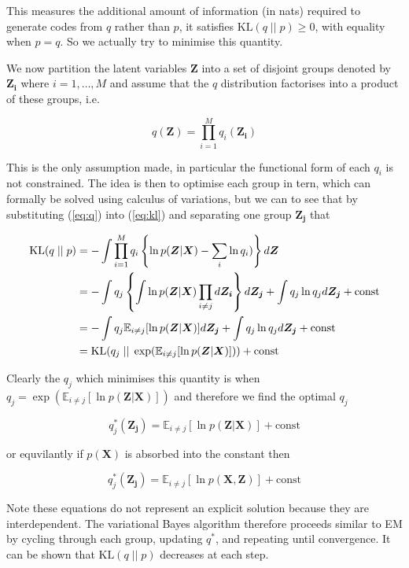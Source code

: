 \documentclass{article}
\begin{document}
This measures the additional amount of information (in nats) required to generate codes from $q$ rather than $p$, it satisfies $\text{KL}(q\; ||\; p) \ge 0$, with equality when $p = q$. So we actually try to minimise this quantity.

We now partition the latent variables $\boldsymbol{Z}$ into a set of disjoint groups denoted by $\boldsymbol{Z_i}$ where $i = 1, \dots, M$ and assume that the $q$ distribution factorises into a product of these groups, i.e.

\begin{equation}
\label{eq:q}
  q(\boldsymbol{Z}) = \prod_{i = 1}^M q_i(\boldsymbol{Z_i})
\end{equation}

This is the only assumption made, in particular the functional form of each $q_i$ is not constrained. The idea is then to optimise each group in tern, which can formally be solved using calculus of variations, but we can to see that by substituting (\ref{eq:q}) into (\ref{eq:kl}) and separating one group $\boldsymbol{Z_j}$ that

\begin{align}
    \text{KL}(q\; ||\; p) &= -\int \prod_{i = 1}^M q_i \left\{ \ln p(\boldsymbol{Z} | \boldsymbol{X}) - \sum_i \ln q_i) \right\} d \boldsymbol{Z}\notag \\
    &= -\int q_j \left\{ \int \ln p(\boldsymbol{Z} | \boldsymbol{X}) \prod_{i \ne j} d \boldsymbol{Z_i} \right\} d \boldsymbol{Z_j} + \int q_j \ln q_j d \boldsymbol{Z_j} + \text{const}\notag\\
    &= -\int q_j \mathbb{E}_{i \ne j}[\ln p(\boldsymbol{Z} | \boldsymbol{X})] d \boldsymbol{Z_j} + \int q_j \ln q_j d \boldsymbol{Z_j} + \text{const}\notag\\
    &= \text{KL}(q_j\; ||\; \exp (\mathbb{E}_{i \ne j}[\ln p(\boldsymbol{Z} | \boldsymbol{X})])) + \text{const}
\end{align}

Clearly the $q_j$ which minimises this quantity is when $q_j = \exp(\mathbb{E}_{i \ne j}[\ln p(\boldsymbol{Z} | \boldsymbol{X})])$ and therefore we find the optimal $q_j$

\begin{equation}
q^*_j(\boldsymbol{Z_j}) = \mathbb{E}_{i \ne j}[\ln p(\boldsymbol{Z} | \boldsymbol{X})] + \text{const}
\end{equation}

or equvilantly if $p(\boldsymbol{X})$ is absorbed into the constant then

\begin{equation}
\label{eq:q_opt}
q^*_j(\boldsymbol{Z_j}) = \mathbb{E}_{i \ne j}[\ln p(\boldsymbol{X}, \boldsymbol{Z})] + \text{const}
\end{equation}

Note these equations do not represent an explicit solution because they are interdependent. The variational Bayes algorithm therefore proceeds similar to EM by cycling through each group, updating $q^*$, and repeating until convergence. It can be shown that $\text{KL}(q\; ||\; p)$ decreases at each step.
\end{document}
